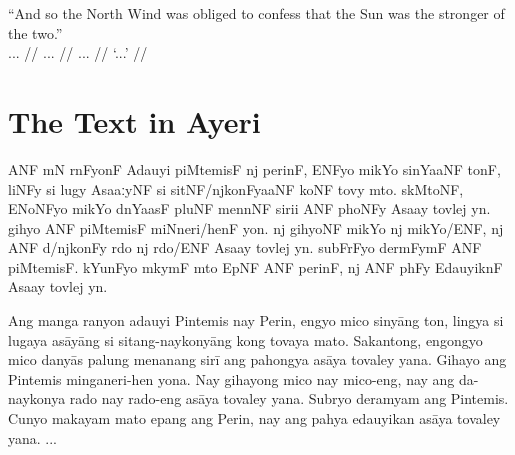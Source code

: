 \documentclass[12pt,paper=a4]{scrartcl}
\newenvironment{ayeri}{
    \doublespacing
    \begin{multicols}{2}
    \Tagati
}{
    \end{multicols} \par
}
\begin{document}
\ex %
\begingl
	\glpreamble \enquote{And so the North Wind was obliged to confess that the Sun was the stronger of the two.}\\
		... //
	\gla ... //
	\glb ... //
	\glft `...' //
\endgl
\xe

\section{The Text in Ayeri}

\begin{ayeri}
\noindent ANF mN rnFyonF Adauyi piMtemisF nj perinF, ENFyo mikYo sinYaaNF tonF, liNFy si lugy AsaaːyNF si sitNF/njkonFyaaNF koNF tovy mto.
skMtoNF, ENoNFyo mikYo dnYaasF pluNF mennNF sirii ANF phoNFy Asaay tovlej yn.
gihyo ANF piM\-temisF miNneri/henF yon.
nj gihyoNF mikYo nj mikYo/ENF, nj ANF d/njkonFy rdo nj rdo/ENF Asaay tovlej yn.
subFrFyo dermFymF ANF piMtemisF.
kYunFyo mkymF mto EpNF ANF perinF, nj ANF phFy EdauyiknF Asaay tovlej yn.
\end{ayeri}

\noindent Ang manga ranyon adauyi Pintemis nay Perin, engyo mico sinyāng ton, lingya si lugaya asāyāng si sitang-naykonyāng kong tovaya mato.
Sakantong, engongyo mico danyās palung menanang sirī ang pahongya asāya tovaley yana.
Gihayo ang Pintemis minganeri-hen yona.
Nay gihayong mico nay mico-eng, nay ang da-naykonya rado nay rado-eng asāya tovaley yana.
Subryo deramyam ang Pintemis.
Cunyo makayam mato epang ang Perin, nay ang pahya edauyikan asāya tovaley yana.
...



\begin{multicols}{3}
\printglossary[style=mysuper,type=\leipzigtype]
\end{multicols}

\printbibliography[heading=bibintoc]
\end{document}
